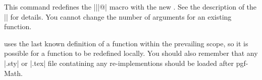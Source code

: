 \begin{command}{\pgfmathredeclarefunction{}}
  
  This command redefines the |\pgfmath||@| macro 
  with the new . See the description of the
  |\pgfmathdeclarefunction| for details. You cannot change the number
  of arguments for an existing function.

\end{command}

  \pgfname{} uses the last known definition of a function within the
  prevailing scope, so it is possible for a function to be redefined 
  locally. You should also remember that any |.sty| or |.tex| file
  contatining any re-implementions should be loaded after pgf-Math.
  